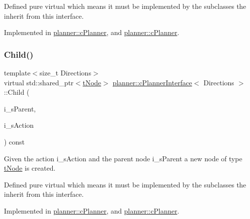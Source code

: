 Defined pure virtual which means it must be implemented by the subclasses the inherit from this interface. 

Implemented in \mbox{\hyperlink{classplanner_1_1c_planner_adbffc6ce05119c940a09369d7e61554e}{planner\+::c\+Planner}}, and \mbox{\hyperlink{classplanner_1_1c_planner_ab260cfcb0ad00d46b02148d19faf040d}{planner\+::c\+Planner}}.

\mbox{\label{classplanner_1_1c_planner_interface_a7e2048c2a4c699a76db90d1cbfecf156}} 
\subsubsection{\texorpdfstring{Child()}{Child()}\hspace{0.1cm}{\footnotesize\ttfamily [2/2]}}
{\footnotesize\ttfamily template$<$size\+\_\+t Directions$>$ \\
virtual std\+::shared\+\_\+ptr$<$\mbox{\hyperlink{structplanner_1_1t_node}{t\+Node}}$>$ \mbox{\hyperlink{classplanner_1_1c_planner_interface}{planner\+::c\+Planner\+Interface}}$<$ Directions $>$\+::Child (\begin{DoxyParamCaption}\item[{std\+::shared\+\_\+ptr$<$ \mbox{\hyperlink{structplanner_1_1t_node}{t\+Node}} $>$ \&}]{i\+\_\+s\+Parent,  }\item[{const \mbox{\hyperlink{structplanner_1_1t_action}{t\+Action}} \&}]{i\+\_\+s\+Action }\end{DoxyParamCaption}) const\hspace{0.3cm}{\ttfamily [pure virtual]}}



Given the action i\+\_\+s\+Action and the parent node i\+\_\+s\+Parent a new node of type \mbox{\hyperlink{structplanner_1_1t_node}{t\+Node}} is created. 

Defined pure virtual which means it must be implemented by the subclasses the inherit from this interface. 

Implemented in \mbox{\hyperlink{classplanner_1_1c_planner_adbffc6ce05119c940a09369d7e61554e}{planner\+::c\+Planner}}, and \mbox{\hyperlink{classplanner_1_1c_planner_ab260cfcb0ad00d46b02148d19faf040d}{planner\+::c\+Planner}}.

\mbox{\label{classplanner_1_1c_planner_interface_afec836d58ce54c49046bf30ecdebbfec}} 
